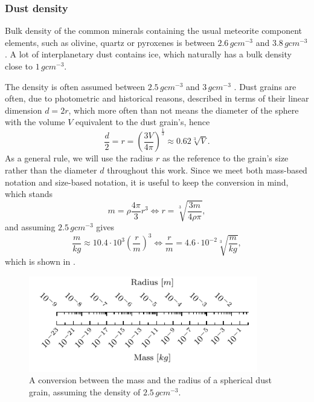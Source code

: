 \subsubsection{Dust density} \label{sec:density}

Bulk density of the common minerals containing the usual meteorite component elements, such as olivine, quartz or pyroxenes is between $2.6 \, \si{g cm^{-3}}$ and $3.8 \, \si{g cm^{-3}}$ \citep{duda1986minerals}. A lot of interplanetary dust contains ice, which naturally has a bulk density close to $1 \, \si{g cm^{-3}}$.

The density is often assumed between $2.5 \, \si{g cm^{-3}}$ \citep{mann2014dust} and $3 \, \si{g cm^{-3}}$ \citep{mcdonnell1984cosmic}. Dust grains are often, due to photometric and historical reasons, described in terms of their linear dimension $d = 2r$, which more often than not means the diameter of the sphere with the volume $V$ equivalent to the dust grain's, hence
\begin{equation}
    \frac{d}{2} = r = \left( {\frac{3V}{4\pi}} \right)^{\frac{1}{3}} \approx 0.62 \sqrt[3]{V}.
\end{equation}
As a general rule, we will use the radius $r$ as the reference to the grain's size rather than the diameter $d$ throughout this work. Since we meet both mass-based notation and size-based notation, it is useful to keep the conversion in mind, which stands
\begin{equation}
    m = \rho \frac{4\pi}{3} r^3 \Leftrightarrow r = \sqrt[3]{\frac{3 m}{4 \rho \pi}},
    \label{eq:density}
\end{equation}
and assuming $2.5 \, \si{g cm^{-3}}$ gives
\begin{equation}
    \frac{m}{\si{kg}} \approx 10.4 \cdot 10^3 \left(\frac{r}{\si{m}}\right)^3 
\Leftrightarrow 
    \frac{r}{\si{m}} = 4.6 \cdot 10^{-2} \sqrt[3]{\frac{m}{\si{kg}}},
\end{equation}
which is shown in .

\begin{figure}[h]
 	\centering
 	\includegraphics[width=10cm]{figures/mass_size_ruler.pdf}
 	\caption{A conversion between the mass and the radius of a spherical dust grain, assuming the density of $2.5 \, \si{g cm^{-3}}$.}
 	\label{fig:mass_size_ruler}
\end{figure}

